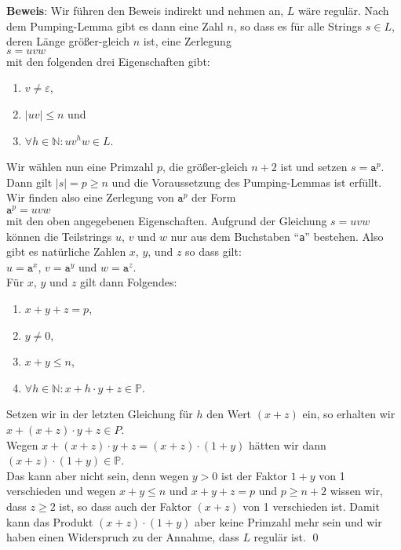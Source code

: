 \noindent
\textbf{Beweis}:
Wir f\"uhren den Beweis indirekt und nehmen an, $L$ w\"are regul\"ar.  Nach
dem Pumping-Lemma gibt es dann eine Zahl $n$, so dass es f\"ur alle Strings $s \in L$, 
deren L\"ange gr\"o{\ss}er-gleich $n$ ist, eine Zerlegung
\\[0.2cm]
\hspace*{1.3cm}
$s = uvw$
\\[0.2cm]
mit den folgenden drei Eigenschaften gibt:
\begin{enumerate}
\item $v \not= \varepsilon$, 
\item $|uv| \leq n$ \quad und
\item $\forall h \in \mathbb{N}: u v^h w \in L$.
\end{enumerate}
Wir w\"ahlen nun eine Primzahl $p$, die gr\"o{\ss}er-gleich  $n + 2$ ist und setzen $s = \mathtt{a}^p$.
Dann gilt $|s| = p \geq n$ und die Voraussetzung des Pumping-Lemmas ist erf\"ullt.
Wir finden also eine Zerlegung von $\mathtt{a}^p$ der Form
\\[0.2cm]
\hspace*{1.3cm}
$\mathtt{a}^p = uvw$ 
\\[0.2cm]
mit den oben angegebenen Eigenschaften.
Aufgrund der Gleichung $s = uvw$ k\"onnen die Teilstrings $u$, $v$ und $w$ nur aus dem
Buchstaben ``\texttt{a}'' bestehen.  Also gibt es nat\"urliche Zahlen $x$, $y$, und
$z$ so dass gilt:
\\[0.2cm]
\hspace*{1.3cm}
$u = \mathtt{a}^x$, \quad $v = \mathtt{a}^y$ \quad und \quad $w = \mathtt{a}^z$.
\\[0.2cm]
F\"ur  $x$, $y$ und $z$ gilt dann Folgendes:
\begin{enumerate}
\item $x + y + z = p$,
\item $y \not= 0$,
\item $x + y \leq n$,
\item $\forall h \in \mathbb{N}: x + h \cdot y + z \in \mathbb{P}$.
\end{enumerate}
Setzen wir in der letzten Gleichung f\"ur $h$ den Wert $(x + z)$ ein, so erhalten wir
\\[0.2cm]
\hspace*{1.3cm}
$x + (x + z)\cdot y + z \in P$.
\\[0.2cm]
Wegen $x + (x + z)\cdot y + z = (x + z) \cdot (1 + y)$ h\"atten wir dann
\\[0.2cm]
\hspace*{1.3cm}
$(x + z) \cdot (1 + y) \in \mathbb{P}$.
\\[0.2cm]
Das kann aber nicht sein, denn wegen $y > 0$ ist der Faktor $1 + y$ von 1
verschieden und wegen $x + y \leq n$ und $x + y + z = p$ und $p \geq n + 2$ wissen wir, dass
$z \geq 2$ ist, so dass auch der Faktor $(x + z)$ von 1 verschieden ist.  Damit kann das Produkt
$(x + z) \cdot (1 + y)$ aber keine Primzahl mehr sein und wir haben einen Widerspruch zu der
Annahme, dass $L$ regul\"ar ist. \qed


